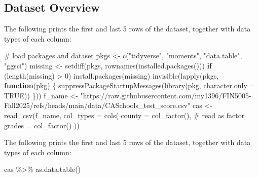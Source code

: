 \documentclass[
  12pt,
  letterpaper,
]{scrbook}
\newenvironment{Shaded}{\begin{snugshade}}{\end{snugshade}}
\newcommand{\AttributeTok}[1]{\textcolor[rgb]{0.40,0.45,0.13}{#1}}
\newcommand{\CommentTok}[1]{\textcolor[rgb]{0.37,0.37,0.37}{#1}}
\newcommand{\ConstantTok}[1]{\textcolor[rgb]{0.56,0.35,0.01}{#1}}
\newcommand{\ControlFlowTok}[1]{\textcolor[rgb]{0.00,0.23,0.31}{\textbf{#1}}}
\newcommand{\DecValTok}[1]{\textcolor[rgb]{0.68,0.00,0.00}{#1}}
\newcommand{\FunctionTok}[1]{\textcolor[rgb]{0.28,0.35,0.67}{#1}}
\newcommand{\NormalTok}[1]{\textcolor[rgb]{0.00,0.23,0.31}{#1}}
\newcommand{\OtherTok}[1]{\textcolor[rgb]{0.00,0.23,0.31}{#1}}
\newcommand{\SpecialCharTok}[1]{\textcolor[rgb]{0.37,0.37,0.37}{#1}}
\newcommand{\StringTok}[1]{\textcolor[rgb]{0.13,0.47,0.30}{#1}}
\theoremstyle{plain}
\theoremstyle{definition}
\theoremstyle{remark}
\begin{document}
\subsection{Dataset Overview}\label{dataset-overview}

The following prints the first and last 5 rows of the dataset, together
with data types of each column:

\begin{Shaded}
\begin{Highlighting}[]
\CommentTok{\# load packages and dataset}
\NormalTok{pkgs }\OtherTok{\textless{}{-}} \FunctionTok{c}\NormalTok{(}\StringTok{"tidyverse"}\NormalTok{, }\StringTok{"moments"}\NormalTok{, }\StringTok{"data.table"}\NormalTok{, }\StringTok{"ggsci"}\NormalTok{)}
\NormalTok{missing }\OtherTok{\textless{}{-}} \FunctionTok{setdiff}\NormalTok{(pkgs, }\FunctionTok{rownames}\NormalTok{(}\FunctionTok{installed.packages}\NormalTok{()))}
\ControlFlowTok{if}\NormalTok{ (}\FunctionTok{length}\NormalTok{(missing) }\SpecialCharTok{\textgreater{}} \DecValTok{0}\NormalTok{) }\FunctionTok{install.packages}\NormalTok{(missing)}
\FunctionTok{invisible}\NormalTok{(}\FunctionTok{lapply}\NormalTok{(pkgs, }\ControlFlowTok{function}\NormalTok{(pkg) \{}
    \FunctionTok{suppressPackageStartupMessages}\NormalTok{(}\FunctionTok{library}\NormalTok{(pkg, }\AttributeTok{character.only =} \ConstantTok{TRUE}\NormalTok{))}
\NormalTok{\}))}
\NormalTok{f\_name }\OtherTok{\textless{}{-}} \StringTok{"https://raw.githubusercontent.com/my1396/FIN5005{-}Fall2025/refs/heads/main/data/CASchools\_test\_score.csv"}
\NormalTok{cas }\OtherTok{\textless{}{-}} \FunctionTok{read\_csv}\NormalTok{(f\_name, }
  \AttributeTok{col\_types =} \FunctionTok{cols}\NormalTok{(}
    \AttributeTok{county =} \FunctionTok{col\_factor}\NormalTok{(), }\CommentTok{\# read as factor}
    \AttributeTok{grades =} \FunctionTok{col\_factor}\NormalTok{()}
\NormalTok{  ))}
\end{Highlighting}
\end{Shaded}

The following prints the first and last 5 rows of the dataset, together
with data types of each column:

\begin{Shaded}
\begin{Highlighting}[]
\NormalTok{cas }\SpecialCharTok{\%\textgreater{}\%} \FunctionTok{as.data.table}\NormalTok{()}
\end{Highlighting}
\end{Shaded}
\end{document}
